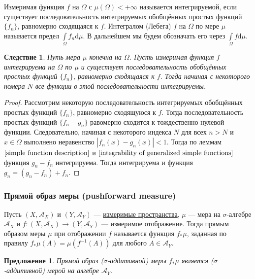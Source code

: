 \documentclass[12pt]{article}
\newtheorem{proposition}[theorem]{Предложение}
\newtheorem{corollary}[theorem]{Следствие}
\numberwithin{theorem}{section}
\theoremstyle{definition}
\newcommand{\defin}[2]{\hypertarget{#2}{{\color{red} #1}}}
\newcommand{\calA}{\mathcal{A}}
\newcommand{\diff}{\mathrm{d}}
\begin{document}
	Измеримая функция $ f $ на $ \Omega $ с $ \mu(\Omega) < +\infty $ называется \defin{интегрируемой}{integrable},
	если существует последовательность интегрируемых обобщённых простых функций $ \{f_n\} $,
	равномерно сходящаяся к $ f $. \defin{Интегралом (Лебега) $ f $ на $ \Omega $ по мере $ \mu $}{integral} 
	называется предел $ \int\limits_{\Omega} f_n \diff\mu $. В дальнейшем мы будем обозначать его через $ \int\limits_{\Omega} f\diff\mu $.
	
	\begin{corollary} \label{any sequence}
		Путь мера $ \mu $ конечна на $ \Omega $.
		Пусть измеримая функция $ f $ интегрируема на $ \Omega $ по $ \mu $
		и существует последовательность обобщённых простых функций $ \{f_n\} $, равномерно сходящаяся к $ f $.
		Тогда начиная с некоторого номера $ N $ все функции в этой последовательности интегрируемы.
	\end{corollary}
	
	\begin{proof}
		Рассмотрим некоторую последовательность интегрируемых обобщённых простых функций $ \{f_n\} $,
		равномерно сходящуюся к $ f $.
		Тогда последовательность простых функций $ \{f_n - g_n\} $ равомерно сходится к тождественно нулевой функции.
		Следовательно, начиная с некоторого индекса $ N $ для всех $ n > N $ и $ x \in \Omega $ выполнено неравенство
		$ |f_n(x) - g_n(x)| < 1 $.
		Тогда по леммам $ \ref{simple function description} $ и $ \ref{integrability of generalized simple functions} $ функция $ g_n - f_n $ интегрируема. Тогда интегрируема и функция $ g_n = (g_n - f_n) + f_n $.
	\end{proof}
	
	\subsubsection{Прямой образ меры (pushforward measure)}
	
	Пусть $ (X, \calA_X) $ и $ (Y, \calA_Y) $ --- \hyperlink{measurable-space}{измеримые пространства},
	$ \mu $ --- мера на $ \sigma $-алгебре $ \calA_X $ и $ f \colon (X, \calA_X) \to (Y, \calA_Y) $
	--- \hyperlink{morphism-of-measurable-spaces}{измеримое отображение}.
	Тогда \defin{прямым образом меры $ \mu $ при отображении $ f $}{pushforward-measure} называется функция $ f_{*}\mu $,
	заданная по правилу $ f_*\mu(A) = \mu(f^{-1}(A)) $ для любого $ A \in \calA_Y $.
	
	\begin{proposition}
		Прямой образ ($ \sigma $-аддитивной) меры $ f_*\mu $ является ($ \sigma $-аддитивной) мерой на алгебре $ \calA_Y $.
	\end{proposition}
	
\end{document}
